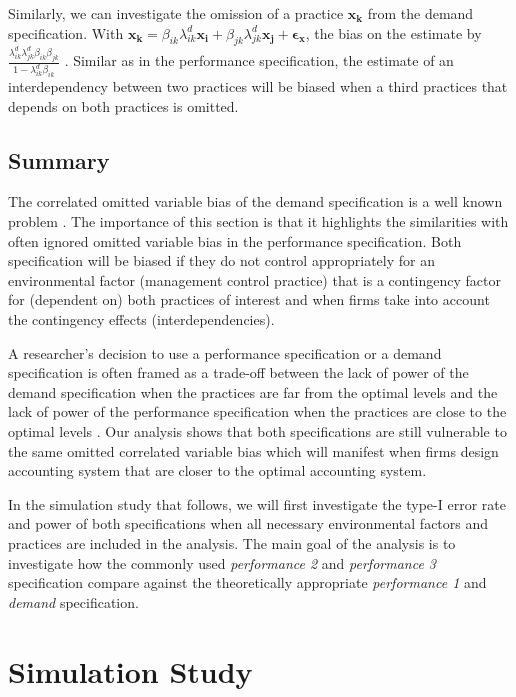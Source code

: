 \documentclass[12pt]{article}
\begin{document}
Similarly, we can investigate the omission of a practice $\mathbf{x_k}$ from the demand specification. With $\mathbf{x_k} = \beta_{ik} \lambda^d_{ik} \mathbf{x_i} + \beta_{jk} \lambda^d_{jk} \mathbf{x_j} + \mathbf{\epsilon_x}$, the bias on the estimate by $\frac{\lambda^d_{ik} \lambda^d_{jk} \beta_{ik} \beta_{jk}}{1 - \lambda^d_{ik} \beta_{ik}}$ . Similar as in the performance specification, the estimate of an interdependency between two practices will be biased when a third practices that depends on both practices is omitted. 

\subsection{Summary}

The correlated omitted variable bias of the demand specification is a well known problem \citep{Grabner2013,Arora1996,Carree2011}. The importance of this section is that it highlights the similarities with often ignored omitted variable bias in the performance specification. Both specification will be biased if they do not control appropriately for an environmental factor (management control practice) that is a contingency factor for (dependent on) both practices of interest and when firms take into account the contingency effects (interdependencies).

A researcher's decision to use a performance specification or a demand specification is often framed as a trade-off between the lack of power of the demand specification when the practices are far from the optimal levels and the lack of power of the performance specification when the practices are close to the optimal levels \citep{Grabner2013,Aral2012}. Our analysis shows that both specifications are still vulnerable to the same omitted correlated variable bias which will manifest when firms design accounting system that are closer to the optimal accounting system.

In the simulation study that follows, we will first investigate the type-I error rate and power of both specifications when all necessary environmental factors and practices are included in the analysis. The main goal of the analysis is to investigate how the commonly used \emph{performance 2} and \emph{performance 3} specification compare against the theoretically appropriate \emph{performance 1} and \emph{demand} specification.

\section{Simulation Study}\label{simulation-study}
\end{document}
